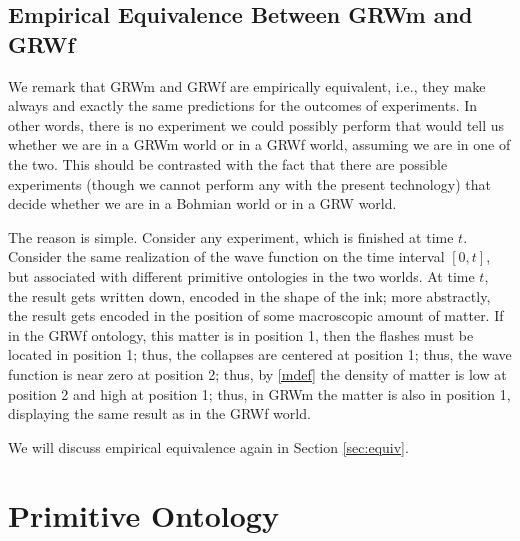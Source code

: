 \documentclass[12pt]{article}
\begin{document}
\subsection{Empirical Equivalence Between GRWm and GRWf}
\label{sec:empequiv}

We remark that {\sf GRWm} and {\sf GRWf} are empirically equivalent, i.e., they make always and exactly the same predictions for the outcomes of experiments. In other words, there is no experiment we could possibly perform that would tell us whether we are in a {\sf GRWm} world or in a {\sf GRWf} world, assuming we are in one of the two. This should be contrasted with the fact that there are possible experiments (though we cannot perform any with the present technology) that decide whether we are in a Bohmian world or in a {\sf GRW} world.

The reason is simple. Consider any experiment, which is finished at time $t$. Consider the same realization of the wave function on the time interval $[0,t]$, but associated with different primitive ontologies in the two worlds. At time $t$, the result gets written down, encoded in the shape of the ink; more abstractly, the result gets encoded in the position of some macroscopic amount of matter. If in the {\sf GRWf} ontology, this matter is in position 1, then the flashes must be located in position 1; thus, the collapses are centered at position 1; thus, the wave function is near zero at position 2; thus, by \eqref{mdef} the density of matter is low at position 2 and high at position 1; thus, in {\sf GRWm} the matter is also in position 1,  displaying the same result as in the {\sf GRWf} world.

We will discuss empirical equivalence again in Section \ref{sec:equiv}. 

\section{Primitive Ontology }
\label{sec:PO}
\end{document}

